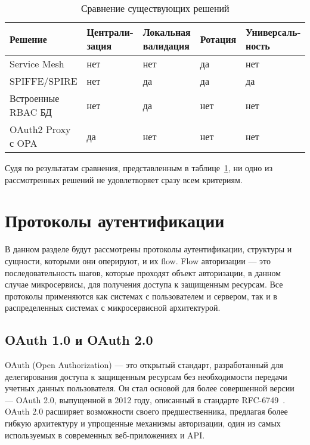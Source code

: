\begin{table}[H]
\caption{Сравнение существующих решений}
\label{tabular:comparison}
\begin{tabular}{|p{3.5cm}|p{3cm}|p{2.5cm}|p{2cm}|p{3cm}|}
\hline
\textbf{Решение} & \textbf{Централи- зация} & \textbf{Локальная валидация} & \textbf{Ротация} & \textbf{Универсаль- ность}
\tabularnewline
\hline
Service Mesh & нет & нет & да & нет 
\tabularnewline
\hline
SPIFFE/SPIRE	 & нет & да & да & да
\tabularnewline
\hline
Встроенные RBAC БД & нет & да & нет & нет 
\tabularnewline
\hline
OAuth2 Proxy с OPA & да & нет & нет & нет
\tabularnewline
\hline

\end{tabular}
\end{table}

Судя по результатам сравнения, представленным в таблице~\ref{tabular:comparison}, ни одно из рассмотренных решений не удовлетворяет сразу всем критериям.

\section{Протоколы аутентификации}
В данном разделе будут рассмотрены протоколы аутентификации, структуры и сущности, которыми они оперируют, и их flow. Flow авторизации --- это последовательность шагов, которые проходят объект авторизации, в данном случае микросервисы, для получения доступа к защищенным ресурсам.
Все протоколы применяются как системах с пользователем и сервером, так и в распределенных системах с микросервисной архитектурой.

\subsection{OAuth 1.0 и OAuth 2.0}
OAuth (Open Authorization) --- это открытый стандарт, разработанный для делегирования доступа к защищенным ресурсам без необходимости передачи учетных данных пользователя. Он стал основой для более совершенной версии — OAuth 2.0, выпущенной в 2012 году, описанный в стандарте RFC-6749~\cite{oauth2_spec}. OAuth 2.0 расширяет возможности своего предшественника, предлагая более гибкую архитектуру и упрощенные механизмы авторизации, один из самых используемых в современных веб-приложениях и API.~\cite{oauth2_artc}


